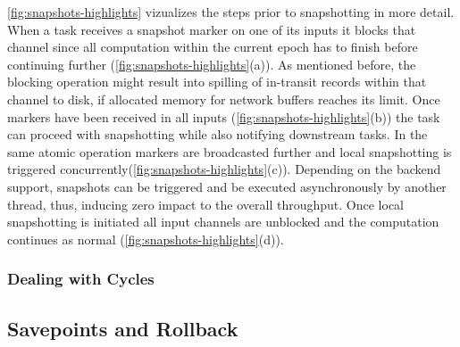  \autoref{fig:snapshots-highlights} vizualizes the steps prior to snapshotting in more detail. When a task receives a snapshot marker on one of its inputs it blocks that channel since all computation within the current epoch has to finish before continuing further (\autoref{fig:snapshots-highlights}(a)). As mentioned before, the blocking operation might result into spilling of in-transit records within that channel to disk, if allocated memory for network buffers reaches its limit. Once markers have been received in all inputs (\autoref{fig:snapshots-highlights}(b)) the task can proceed with snapshotting while also notifying downstream tasks. In the same atomic operation markers are broadcasted further and local snapshotting is triggered concurrently(\autoref{fig:snapshots-highlights}(c)). Depending on the backend support, snapshots can be triggered and be executed asynchronously by another thread, thus, inducing zero impact to the overall throughput. Once local snapshotting is initiated all input channels are unblocked and the computation continues as normal (\autoref{fig:snapshots-highlights}(d)).

\subsubsection{Dealing with Cycles}





\subsection{Savepoints and Rollback}


